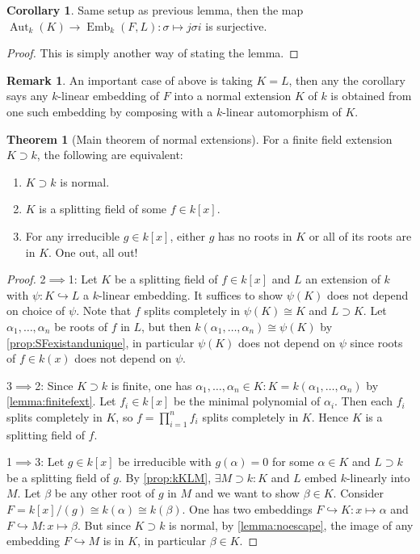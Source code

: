 \documentclass{article}
\newcommand{\Aut}{\operatorname{Aut}}
\newcommand{\Emb}{\operatorname{Emb}}
\theoremstyle{definition}
\newtheorem{thm}[defn]{Theorem}
\newtheorem{coro}[defn]{Corollary}
\newtheorem{remark}[defn]{Remark}
\begin{document}
\begin{coro}
\label{coro:sigmatojsigmaisurj}
Same setup as previous lemma, then the map $\Aut_k(K)\rightarrow\Emb_k(F,L):\sigma\mapsto j\sigma i$ is surjective.
\end{coro}
\begin{proof}
This is simply another way of stating the lemma.
\end{proof}

\begin{remark}
An important case of above is taking $K=L$, then any the corollary says any $k$-linear embedding of $F$ into a normal extension $K$ of $k$ is obtained from one such embedding by composing with a $k$-linear automorphism of $K$.
\end{remark}

\begin{thm}[Main theorem of normal extensions]
\label{thm:normalext}
For a finite field extension $K\supset k$, the following are equivalent:
\begin{enumerate}
\item $K\supset k$ is normal.
\item $K$ is a splitting field of some $f\in k[x]$.
\item For any irreducible $g\in k[x]$, either $g$ has no roots in $K$ or all of its roots are in $K$. \hfill One out, all out!
\end{enumerate}
\end{thm}
\begin{proof}
2$\implies$1: Let $K$ be a splitting field of $f\in k[x]$ and $L$ an extension of $k$ with $\psi:K\hookrightarrow L$ a $k$-linear embedding. It suffices to show $\psi(K)$ does not depend on choice of $\psi$. Note that $f$ splits completely in $\psi(K)\cong K$ and $L\supset K$. Let $\alpha_1,\ldots,\alpha_n$ be roots of $f$ in $L$, but then $k(\alpha_1,\ldots,\alpha_n)\cong\psi(K)$ by \ref{prop:SFexistandunique}, in particular $\psi(K)$ does not depend on $\psi$ since roots of $f\in k(x)$ does not depend on $\psi$.

3$\implies$2: Since $K\supset k$ is finite, one has $\alpha_1,\ldots,\alpha_n\in K:K=k(\alpha_1,\ldots,\alpha_n)$ by \ref{lemma:finitefext}. Let $f_i\in k[x]$ be the minimal polynomial of $\alpha_i$. Then each $f_i$ splits completely in $K$, so $f=\prod_{i=1}^n f_i$ splits completely in $K$. Hence $K$ is a splitting field of $f$.

1$\implies$3: Let $g\in k[x]$ be irreducible with $g(\alpha)=0$ for some $\alpha\in K$ and $L\supset k$ be a splitting field of $g$. By \ref{prop:kKLM}, $\exists M\supset k:K$ and $L$ embed $k$-linearly into $M$. Let $\beta$ be any other root of $g$ in $M$ and we want to show $\beta\in K$. Consider $F=k[x]/(g)\cong k(\alpha)\cong k(\beta)$. One has two embeddings $F\hookrightarrow K:x\mapsto\alpha$ and $F\hookrightarrow M:x\mapsto\beta$. But since $K\supset k$ is normal, by \ref{lemma:noescape}, the image of any embedding $F\hookrightarrow M$ is in $K$, in particular $\beta\in K$.
\end{proof}
\end{document}
